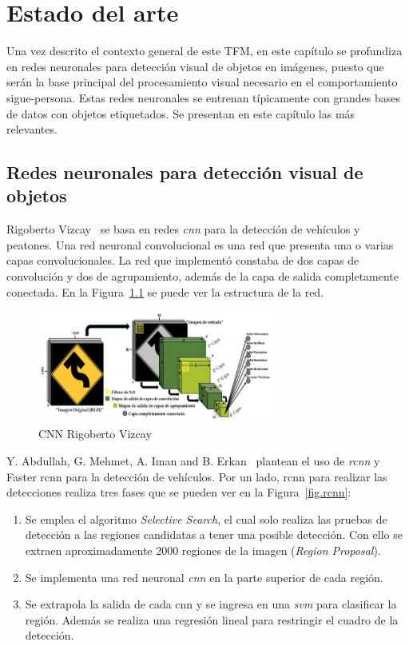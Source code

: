 \chapter{Estado del arte}\label{cap.estado}
Una vez descrito el contexto general de este TFM, en este capítulo se profundiza en redes neuronales para detección visual de objetos en imágenes, puesto que serán la base principal del procesamiento visual necesario en el comportamiento sigue-persona. Estas redes neuronales se entrenan típicamente con grandes bases de datos con objetos etiquetados. Se presentan en este capítulo las más relevantes.
\section{Redes neuronales para detección visual de objetos}
\label{sec:nets}

Rigoberto Vizcay~\cite{tesis_rigoberto} se basa en redes \textit{\acrfull{cnn}} para la detección de vehículos y peatones. Una red neuronal convolucional es una red que presenta una o varias capas convolucionales. La red que implementó constaba de dos capas de convolución y dos de agrupamiento, además de la capa de salida completamente conectada. En la Figura~\ref{fig.cnn_estado_arte} se puede ver la estructura de la red.

\begin{figure}[H]
  \begin{center}
    \includegraphics[width=0.7\textwidth]{figures/estado_arte/cnn.png}
		\caption{CNN Rigoberto Vizcay~\cite{tesis_rigoberto}}
		\label{fig.cnn_estado_arte}
		\end{center}
\end{figure}

Y. Abdullah, G. Mehmet, A. Iman and B. Erkan~\cite{rcnn_detection}  plantean el uso de \textit{\acrfull{rcnn}} y Faster \acrshort{rcnn} para la detección de vehículos. Por un lado, \acrshort{rcnn} para realizar las detecciones realiza tres fases que se pueden ver en la Figura~\ref{fig.rcnn}:
\begin{enumerate}
    \item Se emplea el algoritmo \textit{Selective Search}, el cual solo realiza las pruebas de detección a las regiones candidatas a tener una posible detección. Con ello se extraen aproximadamente 2000 regiones de la imagen (\textit{Region Proposal}).
    \item Se implementa una red neuronal \textit{\acrfull{cnn}} en la parte superior de cada región.
    \item Se extrapola la salida de cada \acrshort{cnn} y se ingresa en una \textit{\acrfull{svm}} para clasificar la región. Además se realiza una regresión lineal para restringir el cuadro de la detección.
\end{enumerate}

